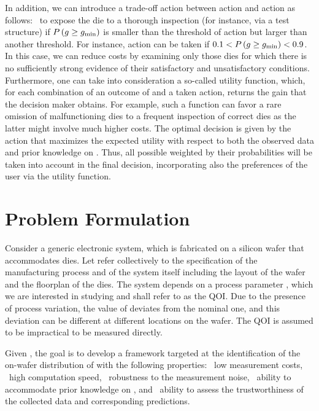 In addition, we can introduce a trade-off action between action \one and action
\two as follows: \three~to expose the die to a thorough inspection (for
instance, via a test structure) if $P\left(g \geq g_{\mathrm{min}}\right)$ is
smaller than the threshold of action \one but larger than another threshold. For
instance, action \three can be taken if $0.1 < P\left(g \geq g_{\mathrm{min}}\right)
< 0.9$. In this case, we can reduce costs by examining only those dies for which
there is no sufficiently strong evidence of their satisfactory and
unsatisfactory conditions. Furthermore, one can take into consideration a
so-called utility function, which, for each combination of an outcome of \g and
a taken action, returns the gain that the decision maker obtains. For example,
such a function can favor a rare omission of malfunctioning dies to a frequent
inspection of correct dies as the latter might involve much higher costs. The
optimal decision is given by the action that maximizes the expected utility with
respect to both the observed data and prior knowledge on \g. Thus, all possible
\g weighted by their probabilities will be taken into account in the final
decision, incorporating also the preferences of the user via the utility
function.

\section{Problem Formulation}

Consider a generic electronic system, which is fabricated on a silicon wafer
that accommodates \nd dies. Let \spec refer collectively to the specification of
the manufacturing process and of the system itself including the layout of the
wafer and the floorplan of the dies. The system depends on a process parameter
\g, which we are interested in studying and shall refer to as the \ac{QOI}. Due
to the presence of process variation, the value of \g deviates from the nominal
one, and this deviation can be different at different locations on the wafer.
The \ac{QOI} is assumed to be impractical to be measured directly.

Given \spec, the goal is to develop a framework targeted at the identification
of the on-wafer distribution of \g with the following properties: \one~low
measurement costs, \two~high computation speed, \three~robustness to the
measurement noise, \four~ability to accommodate prior knowledge on \g, and
\five~ability to assess the trustworthiness of the collected data and
corresponding predictions.

